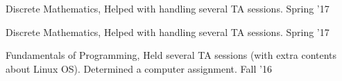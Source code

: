 \begin{cvtas}
  \cvta
    {Discrete Mathematics, } %
    {Helped with handling several TA sessions.} %
    {Spring '17} %
    {} %

  \cvta
    {Discrete Mathematics, } %
    {Helped with handling several TA sessions.} %
    {Spring '17} %
    {} %

  \cvta
    {Fundamentals of Programming, } %
    {Held several TA sessions (with extra contents about Linux OS). Determined a computer assignment.} %
    {Fall '16} %
    {} %


\end{cvtas}





